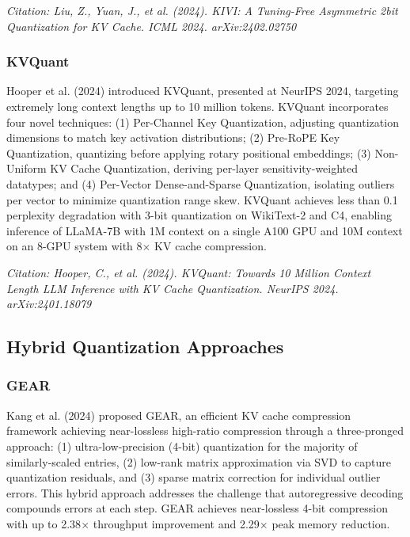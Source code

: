 \documentclass[11pt,letterpaper]{article}
\begin{document}
\textit{Citation: Liu, Z., Yuan, J., et al. (2024). KIVI: A Tuning-Free Asymmetric 2bit Quantization for KV Cache. ICML 2024. arXiv:2402.02750}

\subsubsection{KVQuant}

Hooper et al. (2024) introduced KVQuant, presented at NeurIPS 2024, targeting extremely long context lengths up to 10 million tokens. KVQuant incorporates four novel techniques: (1) Per-Channel Key Quantization, adjusting quantization dimensions to match key activation distributions; (2) Pre-RoPE Key Quantization, quantizing before applying rotary positional embeddings; (3) Non-Uniform KV Cache Quantization, deriving per-layer sensitivity-weighted datatypes; and (4) Per-Vector Dense-and-Sparse Quantization, isolating outliers per vector to minimize quantization range skew. KVQuant achieves less than 0.1 perplexity degradation with 3-bit quantization on WikiText-2 and C4, enabling inference of LLaMA-7B with 1M context on a single A100 GPU and 10M context on an 8-GPU system with 8$\times$ KV cache compression.

\textit{Citation: Hooper, C., et al. (2024). KVQuant: Towards 10 Million Context Length LLM Inference with KV Cache Quantization. NeurIPS 2024. arXiv:2401.18079}

\subsection{Hybrid Quantization Approaches}

\subsubsection{GEAR}

Kang et al. (2024) proposed GEAR, an efficient KV cache compression framework achieving near-lossless high-ratio compression through a three-pronged approach: (1) ultra-low-precision (4-bit) quantization for the majority of similarly-scaled entries, (2) low-rank matrix approximation via SVD to capture quantization residuals, and (3) sparse matrix correction for individual outlier errors. This hybrid approach addresses the challenge that autoregressive decoding compounds errors at each step. GEAR achieves near-lossless 4-bit compression with up to 2.38$\times$ throughput improvement and 2.29$\times$ peak memory reduction.
\end{document}
